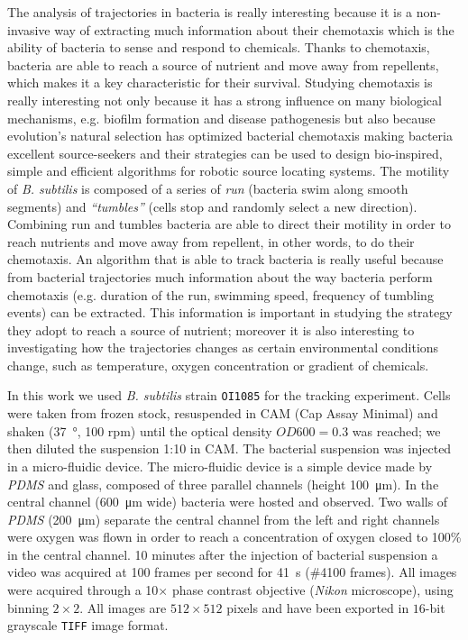 \documentclass[conference]{IEEEtran}
\begin{document}
The analysis of trajectories in bacteria is really interesting because it is a non-invasive way of extracting much information about their chemotaxis which is the ability of bacteria to sense and respond to chemicals.
Thanks to chemotaxis, bacteria are able to reach a source of nutrient and move away from repellents, which makes it a key characteristic for their survival. Studying chemotaxis is really interesting not only because it has a strong influence on many biological mechanisms, e.g. biofilm formation and disease pathogenesis but also because  evolution's natural selection has optimized bacterial chemotaxis making bacteria excellent source-seekers and their strategies can be used to design bio-inspired, simple and efficient algorithms for robotic source locating systems. 
The motility  of \textit{B. subtilis} is composed of a series of \textit{run} (bacteria swim along smooth segments) and \textit{``tumbles''} (cells stop and randomly select a new direction).
Combining run and tumbles bacteria are able to direct their motility in order to reach nutrients and move away from repellent, in other words, to do their chemotaxis.
An algorithm that is able to track bacteria is really useful  because from bacterial trajectories much information about the way bacteria perform chemotaxis (e.g. duration of the run, swimming speed, frequency of tumbling events) can be extracted. 
This information is important in studying the strategy they adopt to reach a source of nutrient; moreover it is also interesting to investigating how the trajectories changes as certain environmental conditions change, such as temperature, oxygen concentration or gradient of chemicals.


In this work we used \textit{B. subtilis} strain \texttt{OI1085} for the tracking experiment.
Cells were taken from frozen stock, resuspended in CAM (Cap Assay Minimal) and shaken  (\SI{37}{\degree}, 100 rpm) until the optical density $OD600=0.3$ was reached; we then diluted the suspension 1:10 in CAM.
The bacterial suspension was injected in a micro-fluidic device.
The micro-fluidic device is a simple device made by \textit{PDMS} and glass, composed of three parallel channels (height  \SI{100}{\micro\meter}).
In the central channel (\SI{600}{\micro\meter} wide) bacteria were hosted and observed.
Two  walls of \textit{PDMS} (\SI{200}{\micro\metre}) separate the central channel from the left and right channels were oxygen was flown in order to reach a concentration of oxygen closed to 100\% in the central channel.
10 minutes after the injection of bacterial suspension a video was acquired at 100 frames per second for \SI{41}{\second}  (\#4100 frames). All images were acquired through a 10$\times$ phase contrast objective (\textit{Nikon} microscope), using binning $2 \times 2$.
All images are $512 \times 512$ pixels and have been exported in $16$-bit grayscale \texttt{TIFF} image format.
\end{document}
